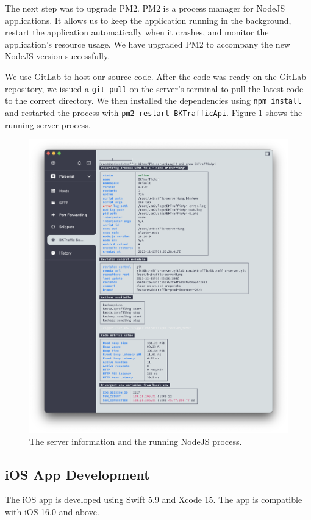 The next step was to upgrade PM2. PM2 is a process manager for NodeJS applications. It allows us to keep the application running in the background, restart the application automatically when it crashes, and monitor the application's resource usage. We have upgraded PM2 to accompany the new NodeJS version successfully.

We use GitLab to host our source code. After the code was ready on the GitLab repository, we issued a \lstinline{git pull} on the server's terminal to pull the latest code to the correct directory. We then installed the dependencies using \lstinline{npm install} and restarted the process with \lstinline{pm2 restart BKTrafficApi}. Figure \ref{fig:pm2_show} shows the running server process.

\begin{figure}[H]
    \includegraphics[width=\textwidth]{assets/images/Implementation/pm2_show.png}
    \caption{The server information and the running NodeJS process.}
    \label{fig:pm2_show}
\end{figure}

\subsection{iOS App Development}
The iOS app is developed using Swift 5.9 and Xcode 15. The app is compatible with iOS 16.0 and above.

